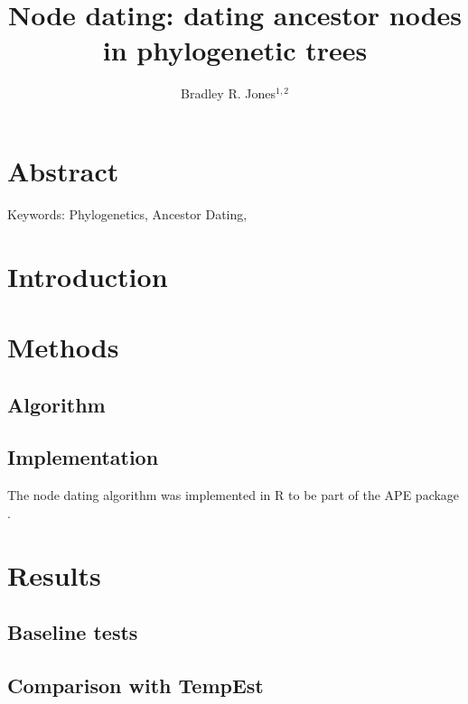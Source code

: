 \documentclass[12pt]{article}
\begin{document}
\title{Node dating: dating ancestor nodes in phylogenetic trees}

\author{Bradley R. Jones$^{1,2}$}
\baselineskip 22pt
\pagewiselinenumbers

\date{}
\maketitle

\section * {Abstract}

Keywords: 
Phylogenetics, Ancestor Dating,  \\



\underline{}
\section*{Introduction} \label{sec:intro}


\section*{Methods} \label{sec:methods}
\subsection*{Algorithm} \label{sec:alg}

\subsection*{Implementation} \label{sec:impl}
The node dating algorithm was implemented in R to be part of the APE package \citep{APE}.

\section*{Results} \label{sec:results}
\subsection*{Baseline tests} \label{sec:test}

\subsection*{Comparison with TempEst} \label{sec:tempest}
\end{document}
